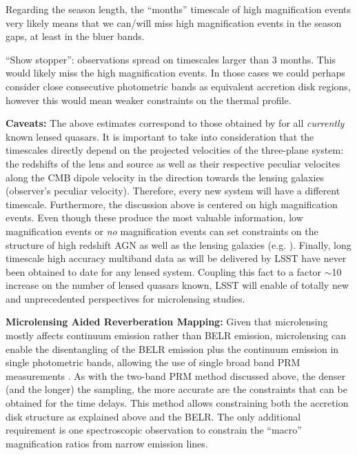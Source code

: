 Regarding the season length, the ``months'' timescale of high
magnification events very likely means that we can/will miss high
magnification events in the season gaps, at least in the bluer bands.

``Show stopper'': observations spread on timescales larger than 3 months.
This would likely miss the high magnification events. In those cases
we could perhaps consider close consecutive photometric bands as
equivalent accretion disk regions, however this would mean weaker
constraints on the thermal profile.

{\bf Caveats:} The above estimates correspond to those obtained by 
\citet{MosqueraandKochanek2011} for all \emph{currently} known lensed quasars. 
It is important to take into consideration that the timescales directly depend 
on the projected velocities of the three-plane system: the redshifts of the lens 
and source as well as their respective peculiar velocites along the CMB dipole 
velocity in the direction towards the lensing galaxies (observer's peculiar 
velocity). Therefore, every new system will have a different timescale. 
Furthermore, the discussion above is centered on high magnification events. Even 
though these produce the most valuable information, low magnification events or 
\emph{no} magnification events can set constraints on the structure of high 
redshift AGN as well as the lensing galaxies (e.g. \citealt{gilmerino2005}). 
Finally, long timescale high accuracy multiband data as will be delivered by 
LSST have never been obtained to date for any lensed system. Coupling this fact 
to a factor $\sim$10 increase on the number of lensed quasars known, LSST will 
enable of totally new and unprecedented perspectives for microlensing studies.
%

{\bf Microlensing Aided Reverberation Mapping:} Given that microlensing mostly 
affects continuum emission rather than BELR emission, microlensing can enable 
the disentangling of the BELR emission plus the continuum emission in single 
photometric bands, allowing the use of single broad band PRM measurements 
\citep{SluseandTewes2014}. As with the two-band PRM method discussed above, the 
denser (and the longer) the sampling, the more accurate are the constraints that 
can be obtained for the time delays. This method allows constraining both the 
accretion disk structure as explained above and the BELR. The only additional 
requirement is one spectroscopic observation to constrain the ``macro'' 
magnification ratios from narrow emission lines.

